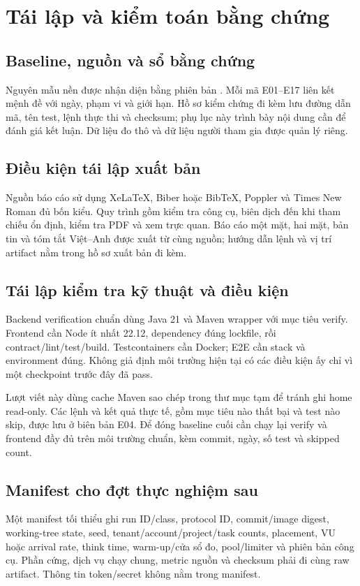 \chapter{Tái lập và kiểm toán bằng chứng}\label{app:evidence}
\section{Baseline, nguồn và sổ bằng chứng}
Nguyên mẫu nền được nhận diện bằng phiên bản \BaselineCommit. Mỗi mã E01--E17 liên kết mệnh đề với ngày, phạm vi và giới hạn. Hồ sơ kiểm chứng đi kèm lưu đường dẫn mã, tên test, lệnh thực thi và checksum; phụ lục này trình bày nội dung cần để đánh giá kết luận. Dữ liệu đo thô và dữ liệu người tham gia được quản lý riêng.


\section{Điều kiện tái lập xuất bản}
Nguồn báo cáo sử dụng XeLaTeX, Biber hoặc BibTeX, Poppler và Times New Roman đủ bốn kiểu. Quy trình gồm kiểm tra công cụ, biên dịch đến khi tham chiếu ổn định, kiểm tra PDF và xem trực quan. Báo cáo một mặt, hai mặt, bản tin và tóm tắt Việt--Anh được xuất từ cùng nguồn; hướng dẫn lệnh và vị trí artifact nằm trong hồ sơ xuất bản đi kèm.

\section{Tái lập kiểm tra kỹ thuật và điều kiện}
Backend verification chuẩn dùng Java 21 và Maven wrapper với mục tiêu verify. Frontend cần Node ít nhất 22.12, dependency đúng lockfile, rồi contract\slash lint\slash test\slash build. Testcontainers cần Docker; E2E cần stack và environment đúng. Không giả định môi trường hiện tại có các điều kiện ấy chỉ vì một checkpoint trước đây đã pass.

Lượt viết này dùng cache Maven sao chép trong thư mục tạm để tránh ghi home read-only. Các lệnh và kết quả thực tế, gồm mục tiêu nào thất bại và test nào skip, được lưu ở biên bản E04. Để đóng baseline cuối cần chạy lại verify và frontend đầy đủ trên môi trường chuẩn, kèm commit, ngày, số test và skipped count.

\section{Manifest cho đợt thực nghiệm sau}
Một manifest tối thiểu ghi run ID\slash class, protocol ID, commit\slash image digest, working-tree state, seed, tenant\slash account\slash project\slash task counts, placement, VU hoặc arrival rate, think time, warm-up\slash cửa sổ đo, pool\slash limiter và phiên bản công cụ. Phần cứng, dịch vụ chạy chung, metric nguồn và checksum phải đi cùng raw artifact. Thông tin token\slash secret không nằm trong manifest.

